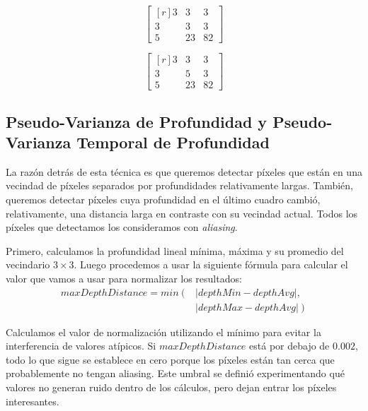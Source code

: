 \documentclass[pregrado]{tesis-usb} %
\begin{document}
\begin{equation}
\begin{bmatrix*}[r]\label{eq:triang_index_not_aliased}
3 &  3 & 3 \\
3 &  3 & 3 \\
5 &  23 & 82
\end{bmatrix*}
\end{equation}

\begin{equation}
\begin{bmatrix*}[r]\label{eq:triang_index_aliased}
3 &  3 & 3 \\
3 &  5 & 3 \\
5 &  23 & 82
\end{bmatrix*}
\end{equation}

\subsection{Pseudo-Varianza de Profundidad y Pseudo-Varianza Temporal de Profundidad}
La razón detrás de esta técnica es que queremos detectar píxeles que están en una vecindad de píxeles separados por profundidades relativamente largas. También, queremos detectar píxeles cuya profundidad en el último cuadro cambió, relativamente, una distancia larga en contraste con su vecindad actual. Todos los píxeles que detectamos los consideramos con \textit{aliasing}.

Primero, calculamos la profundidad lineal mínima, máxima y su promedio del vecindario $3\times 3$. Luego procedemos a usar la siguiente fórmula para calcular el valor que vamos a usar para normalizar los resultados: 
\begin{equation} \label{eq:maxdepthdistance}
\begin{split} 
	maxDepthDistance = min \left( \right. & \left| depthMin-depthAvg \right|  ,   \\ 
	 &  \left.\left| depthMax-depthAvg\right| \right) 
\end{split} 
\end{equation}

Calculamos el valor de normalización utilizando el mínimo para evitar la interferencia de valores atípicos. Si $maxDepthDistance$ está por debajo de $0.002$, todo lo que sigue se establece en cero porque los píxeles están tan cerca que probablemente no tengan aliasing. Este umbral se definió experimentando qué valores no generan ruido dentro de los cálculos, pero dejan entrar los píxeles interesantes.
\end{document}
